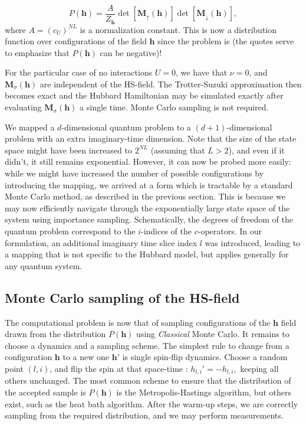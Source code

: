 \begin{equation}
P(\bm h) = \frac{A}{Z_{\bm h}} \det [ \bm M_{\uparrow}(\bm h) ] \det [ \bm M_{\downarrow}(\bm h) ] ,
\end{equation}
where $A = (c_U)^{NL}$ is a normalization constant.
This is now a distribution function over configurations of the field $\bm h$ since the problem is  (the quotes serve to emphasize that $P (\bm h )$ can be negative)!

For the particular case of no interactions $U = 0$, we have that $\nu = 0$, and $\bm M_\sigma (\bm h)$ are independent of the HS-field. 
The Trotter-Suzuki approximation then becomes exact and the Hubbard Hamiltonian may be simulated exactly after evaluating $\bm M_\sigma (\bm h)$ a single time.
Monte Carlo sampling is not required.

We mapped a $d$-dimensional quantum problem to a $(d+1)$-dimensional  problem with an extra imaginary-time dimension.
Note that the size of the state space might have been increased to $2^{NL}$ (assuming that $L > 2$), and even if it didn't, it still remains exponential.
However, it can now be probed more easily: while we might have increased the number of possible configurations by introducing the mapping, we arrived at a form which is tractable by a standard Monte Carlo method, as described in the previous section.
This is because we may now efficiently navigate through the exponentially large state space of the system using importance sampling.
Schematically, the degrees of freedom of the quantum problem correspond to the $i$-indices of the $c$-operators.
In our formulation, an additional imaginary time slice index $l$ was introduced, leading to a mapping that is not specific to the Hubbard model, but applies generally for any quantum system.

\subsection{Monte Carlo sampling of the HS-field}
\label{subsec:mc_hs}

The computational problem is now that of sampling configurations of the $\bm h$ field drawn from the distribution $P(\bm h)$ using \emph{Classical} Monte Carlo.
It remains to choose a dynamics and a sampling scheme. The simplest rule to change from a configuration $\bm h$ to a new one $\bm h'$ is single spin-flip dynamics. 
Choose a random point $(l, i)$, and flip the spin at that space-time  :
$
h_{l, i}' = - h_{l, i},
$
keeping all others unchanged.
The most common scheme to ensure that the distribution of the accepted sample is $P(\bm h)$ is the Metropolis-Hastings algorithm, but others exist, such as the heat bath algorithm.
After the warm-up steps, we are correctly sampling from the required distribution, and we may perform measurements.

